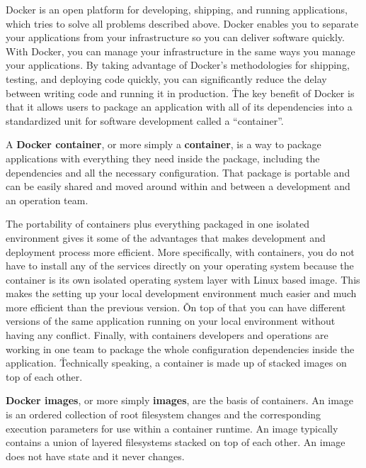 Docker is an open platform for developing, shipping, and running applications, which tries to solve all problems
described above. Docker enables you to separate your applications from your infrastructure so you can deliver
software quickly. With Docker, you can manage your infrastructure in the same ways you manage your applications. By
taking advantage of Docker’s methodologies for shipping, testing, and deploying code quickly, you can significantly
reduce the delay between writing code and running it in production. \v

The key benefit of Docker is that it allows users to package an application with all of its dependencies into a
standardized unit for software development called a ``container''.

A \textbf{Docker container}, or more simply a \textbf{container}, is a way to package applications with everything
they need inside the package, including the dependencies and all the necessary configuration. That package is
portable and can be easily shared and moved around within and between a development and an operation team.
\ed

The portability of containers plus everything packaged in one isolated environment gives it some of the advantages
that makes development and deployment process more efficient. More specifically, with containers, you do not have to
install any of the services directly on your operating system because the container is its own isolated operating
system layer with Linux based image. This makes the setting up your local development environment much easier and
much more efficient than the previous version. \v

On top of that you can have different versions of the same application running on your local environment without
having any conflict. Finally, with containers developers and operations are working in one team to package the whole
configuration dependencies inside the application. \v

Technically speaking, a container is made up of stacked images on top of each other.

\textbf{Docker images}, or more simply \textbf{images}, are the basis of containers. An image is an ordered
collection of root filesystem changes and the corresponding execution parameters for use within a container runtime.
An image typically contains a union of layered filesystems stacked on top of each other. An image does not have state
and it never changes.
\ed

